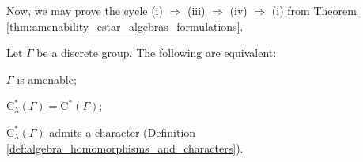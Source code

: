 Now, we may prove the cycle (i) $\Rightarrow $ (iii) $\Rightarrow$ (iv) $\Rightarrow$ (i) from Theorem \ref{thm:amenability_cstar_algebras_formulations}.
\begin{theorem}
  Let $\Gamma$ be a discrete group. The following are equivalent:
  \begin{description}[font=\normalfont]
    \item[(i)] $\Gamma$ is amenable;
    \item[(iii)] $\mathrm{C}^{\ast}_{\lambda}\left( \Gamma \right) = \mathrm{C}^{\ast}\left( \Gamma \right)$;
    \item[(iv)] $\mathrm{C}^{\ast}_{\lambda}\left( \Gamma \right)$ admits a character (Definition \ref{def:algebra_homomorphisms_and_characters}).
  \end{description}
\end{theorem}
